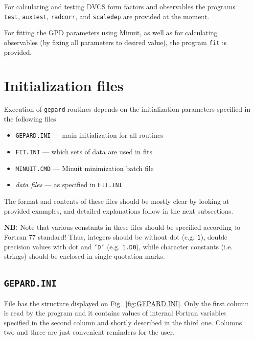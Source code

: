 \documentclass[12pt]{article}
\begin{document}
For calculating and testing DVCS form factors and observables the programs \texttt{test},
\texttt{auxtest}, \texttt{radcorr}, and \texttt{scaledep} are provided at the
moment.

For fitting the GPD parameters using Minuit, as well as for calculating observables (by
fixing all parameters to desired value), the program \texttt{fit} is provided.

\section{Initialization files}
\label{sec:init}

Execution of \texttt{gepard} routines depends on the initialization parameters specified in
the following files
\begin{itemize}
\item  \texttt{GEPARD.INI} --- main initialization for all routines
\item  \texttt{FIT.INI} --- which sets of data are used in fits
\item \texttt{MINUIT.CMD} --- Minuit minimization batch file
\item \emph{data files} --- as specified in \texttt{FIT.INI}
\end{itemize}
The format and contents of these files should be mostly clear by looking at provided
examples, and detailed explanations follow in the next subsections.

\textbf{NB:} Note that various constants in these files should be specified
according to Fortran 77 standard! Thus, integers should be without dot (e.g.
\texttt{1}), double precision values with dot and \texttt{'D'} (e.g.
\texttt{1.D0}), while character constants (i.e. strings) should be enclosed in
single quotation marks.

\subsection{\texttt{GEPARD.INI}}
\label{ssect:GEPARD.INI}

File has the structure displayed on Fig.~\ref{fig:GEPARD.INI}.
Only the first column is read by the program and it contains
values of internal Fortran variables specified in the second column and
shortly described in the third one. 
Columns two and three are just convenient reminders for the user. 
\end{document}
